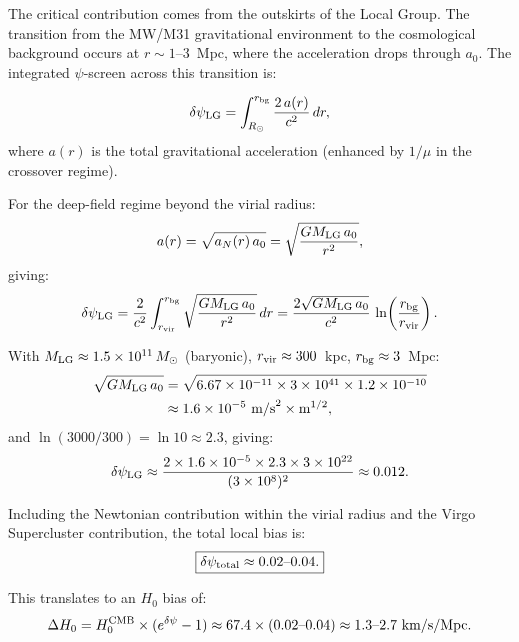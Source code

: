 \documentclass[aps,prd,twocolumn,superscriptaddress,nofootinbib]{revtex4-2}
\begin{document}
The critical contribution comes from the outskirts of the
Local Group. The transition from the MW/M31 gravitational
environment to the cosmological background occurs at
$r \sim 1$--$3$~Mpc, where the acceleration drops through $a_0$.
The integrated $\psi$-screen across this transition is:

\begin{equation}\label{eq:delta-psi-local}
\delta\psi_{\rm LG} = \int_{R_\odot}^{r_{\rm bg}}
\frac{2\,a(r)}{c^2}\,dr,
\end{equation}
where $a(r)$ is the total gravitational acceleration (enhanced
by $1/\mu$ in the crossover regime).

For the deep-field regime beyond the virial radius:
\begin{equation}
a(r) = \sqrt{a_N(r)\,a_0} = \sqrt{\frac{GM_{\rm LG}\,a_0}{r^2}},
\end{equation}
giving:
\begin{equation}
\delta\psi_{\rm LG} = \frac{2}{c^2}\int_{r_{\rm vir}}^{r_{\rm bg}}
\sqrt{\frac{GM_{\rm LG}\,a_0}{r^2}}\,dr
= \frac{2\sqrt{GM_{\rm LG}\,a_0}}{c^2}\,
\ln\!\left(\frac{r_{\rm bg}}{r_{\rm vir}}\right).
\end{equation}

With $M_{\rm LG} \approx 1.5\times 10^{11}\,M_\odot$ (baryonic),
$r_{\rm vir} \approx 300$~kpc, $r_{\rm bg} \approx 3$~Mpc:
\begin{align}
\sqrt{GM_{\rm LG}\,a_0} &= \sqrt{6.67\times10^{-11}\times 3\times10^{41}
\times 1.2\times10^{-10}} \nonumber\\
&\approx 1.6\times10^{-5}~\text{m/s}^2\times\text{m}^{1/2},
\end{align}
and $\ln(3000/300) = \ln 10 \approx 2.3$, giving:
\begin{equation}
\delta\psi_{\rm LG} \approx \frac{2\times 1.6\times10^{-5}\times
2.3\times 3\times10^{22}}{(3\times10^8)^2}
\approx 0.012.
\end{equation}

Including the Newtonian contribution within the virial radius
and the Virgo Supercluster contribution, the total local bias is:
\begin{equation}\label{eq:H0-bias}
\boxed{\delta\psi_{\rm total} \approx 0.02\text{--}0.04.}
\end{equation}

This translates to an $H_0$ bias of:
\begin{equation}
\Delta H_0 = H_0^{\rm CMB}\times(e^{\delta\psi} - 1)
\approx 67.4\times(0.02\text{--}0.04)
\approx 1.3\text{--}2.7~\text{km/s/Mpc}.
\end{equation}
\end{document}
